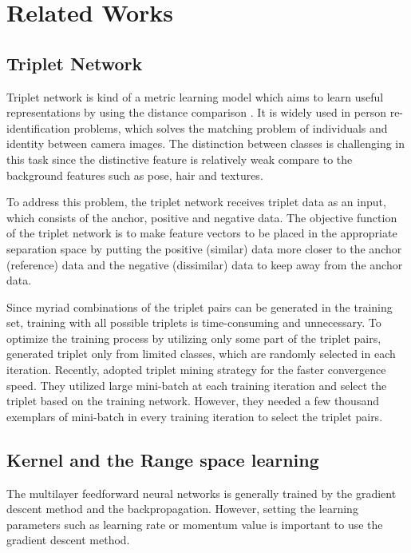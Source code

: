 \documentclass[runningheads]{llncs}
\begin{document}
\section{Related Works}

\subsection{Triplet Network}
Triplet network is kind of a metric learning model \cite{weinberger2006distance} which aims to learn useful representations by using the distance comparison \cite{hoffer2015deep}. It is widely used in person re-identification problems, which solves the matching problem of individuals and identity between camera images\cite{chen2017beyond,cheng2016person,ding2015deep,schroff2015facenet,wang2016joint}. 
The distinction between classes is challenging in this task since the distinctive feature is relatively weak compare to the background features such as pose, hair and textures.

To address this problem, the triplet network receives triplet data as an input, which consists of the anchor, positive and negative data. The objective function of the triplet network is to make feature vectors to be placed in the appropriate separation space by putting the positive (similar) data more closer to the anchor (reference) data and the negative (dissimilar) data to keep away from the anchor data.

Since myriad combinations of the triplet pairs can be generated in the training set, training with all possible triplets is time-consuming and unnecessary. To optimize the training process by utilizing only some part of the triplet pairs, \cite{cheng2016person,ding2015deep,wang2016joint} generated triplet only from limited classes, which are randomly selected in each iteration.
Recently, \cite{schroff2015facenet} adopted triplet mining strategy for the faster convergence speed. They utilized large mini-batch at each training iteration and select the triplet based on the training network.
However, they needed a few thousand exemplars of mini-batch in every training iteration to select the triplet pairs.

\subsection{Kernel and the Range space learning}\label{kar}

The multilayer feedforward neural networks is generally trained by the gradient descent method and the backpropagation.
However, setting the learning parameters such as learning rate or momentum value is important to use the gradient descent method. 
\end{document}
